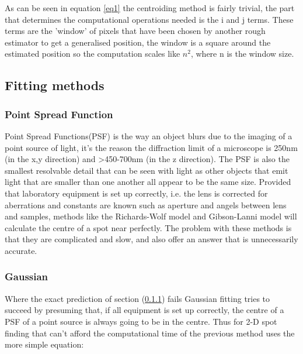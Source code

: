 \documentclass[aps,pra,a4paper,nofootinbib,onecolumn,tightenlines,longbibliography,12pt,amsfonts,amssymb,amsmath,floatfix]{revtex4-2} %
\begin{document}
  As can be seen in equation \ref{eq1} the centroiding method is fairly trivial, 
  the part that determines the computational operations needed is the i and j terms. 
  These terms are the 'window' of pixels that have been chosen by another rough estimator 
  to get a generalised position, the window is a square around the estimated position so 
  the computation scales like $n^2$, where n is the window size.\cite{stone1989comparison}
  
  \subsection{Fitting methods} %
  \label{sub:Various fitting methods}

  \subsubsection{Point Spread Function} %
    \label{ssub:Point Spread Function}
    
    Point Spread Functions(PSF) is the way an object blurs due to the imaging of a point 
    source of light, it's the reason the diffraction limit of a microscope is 250nm (in the
    x,y direction) and >450-700nm (in the z direction).\cite{galbraith2011super} The PSF is also the smallest resolvable
    detail that can be seen with light as other objects that emit light that are smaller than 
    one another all appear to be the same size. Provided that laboratory equipment is set up correctly, 
    i.e. the lens is corrected for aberrations and constants are known such as aperture and angels 
    between lens and samples, methods like the Richards-Wolf model and Gibson-Lanni model will calculate
    the centre of a spot near perfectly. The problem with these methods is that they are complicated and 
    slow, and also offer an answer that is unnecessarily accurate. \cite{richards1959electromagnetic}\cite{small2014fluorophore}


    \subsubsection{Gaussian} %
    \label{ssub:Gaussian}

    Where the exact prediction of section (\ref{ssub:Point Spread Function}) fails Gaussian fitting tries to succeed 
    by presuming that, if all equipment is set up correctly, the centre of a PSF of a point source is 
    always going to be in the centre. Thus for 2-D spot finding that can't afford the computational time of 
    the previous method uses the more simple equation:
\end{document}
